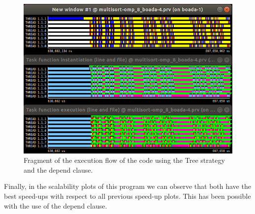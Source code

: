 \documentclass[12pt, a4paper]{article}
\begin{document}
\begin{figure}[H]
	\centering
	\includegraphics[scale=0.45]{./images/S3/Tree_depend_paraver}

	\label{fig:depend_tree}	
	\caption{Fragment of the execution flow of the code using the Tree strategy and the depend clause.}
\end{figure}

Finally, in the scalability plots of this program we can observe that both have the best speed-ups with respect to all previous speed-up plots. This has been possible with the use of the depend clause.
\end{document}

